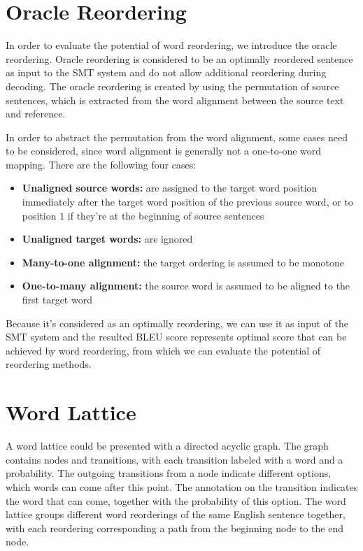 \section{Oracle Reordering}
\label{ch:Foundations:sec:oracle}

In order to evaluate the potential of word reordering, we introduce the oracle reordering. Oracle reordering is considered to be an optimally reordered sentence as input to the SMT system and do not allow additional reordering during decoding. \citep{combine} The oracle reordering is created by using the permutation of source sentences, which is extracted from the word alignment between the source text and reference.

In order to abstract the permutation from the word alignment, some cases need to be considered, since word alignment is generally not a one-to-one word mapping. There are the following four cases: \citep{birch2}

\begin{itemize}
\setlength{\itemsep}{0cm}%
\setlength{\parskip}{0cm}%
\item \textbf{Unaligned source words:} are assigned to the target word position immediately after the target word position of the previous source word, or to position $1$ if they're at the beginning of source sentences
\item \textbf{Unaligned target words:} are ignored
\item \textbf{Many-to-one alignment:} the target ordering is assumed to be monotone
\item \textbf{One-to-many alignment:} the source word is assumed to be aligned to the first target word
\end{itemize}

Because it's considered as an optimally reordering, we can use it as input of the SMT system and the resulted BLEU score represents optimal score that can be achieved by word reordering, from which we can evaluate the potential of reordering methods.

\section{Word Lattice}
\label{ch:Foundations:sec:Lattices}
\label{latticecreation}
A word lattice could be presented with a directed acyclic graph. The graph contains nodes and transitions, with each transition labeled with a word and a probability. The outgoing transitions from a node indicate different options, which words can come after this point. The annotation on the transition indicates the word that can come, together with the probability of this option. The word lattice groups different word reorderings of the same English sentence together, with each reordering corresponding a path from the beginning node to the end node. 


